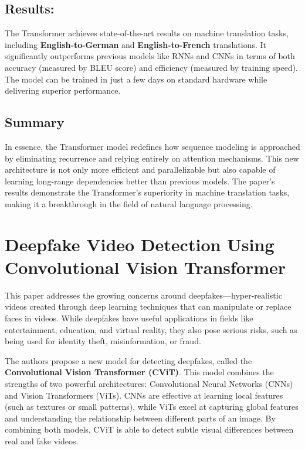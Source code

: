 \documentclass{report}
\begin{document}
	
	\section{Results:}
	The Transformer achieves state-of-the-art results on machine translation tasks, including \textbf{English-to-German} and \textbf{English-to-French} translations. It significantly outperforms previous models like RNNs and CNNs in terms of both accuracy (measured by BLEU score) and efficiency (measured by training speed). The model can be trained in just a few days on standard hardware while delivering superior performance.
	
	
	\section{Summary}
	In essence, the Transformer model redefines how sequence modeling is approached by eliminating recurrence and relying entirely on attention mechanisms. This new architecture is not only more efficient and parallelizable but also capable of learning long-range dependencies better than previous models. The paper’s results demonstrate the Transformer’s superiority in machine translation tasks, making it a breakthrough in the field of natural language processing.
	
	
	
	
	
	
	
	
	
	
	
	
	
	
	
	
	\chapter{Deepfake Video Detection Using Convolutional Vision Transformer \cite{DBLP:journals/corr/abs-2102-11126}}
	
	This paper addresses the growing concerns around deepfakes—hyper-realistic videos created through deep learning techniques that can manipulate or replace faces in videos. While deepfakes have useful applications in fields like entertainment, education, and virtual reality, they also pose serious risks, such as being used for identity theft, misinformation, or fraud.
	
	The authors propose a new model for detecting deepfakes, called the \textbf{Convolutional Vision Transformer (CViT)}. This model combines the strengths of two powerful architectures: Convolutional Neural Networks (CNNs) and Vision Transformers (ViTs). CNNs are effective at learning local features (such as textures or small patterns), while ViTs excel at capturing global features and understanding the relationship between different parts of an image. By combining both models, CViT is able to detect subtle visual differences between real and fake videos.
	
\end{document}
